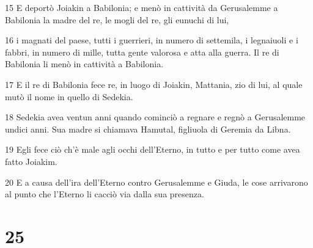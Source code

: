 \par 15 E deportò Joiakin a Babilonia; e menò in cattività da Gerusalemme a Babilonia la madre del re, le mogli del re, gli eunuchi di lui,
\par 16 i magnati del paese, tutti i guerrieri, in numero di settemila, i legnaiuoli e i fabbri, in numero di mille, tutta gente valorosa e atta alla guerra. Il re di Babilonia li menò in cattività a Babilonia.
\par 17 E il re di Babilonia fece re, in luogo di Joiakin, Mattania, zio di lui, al quale mutò il nome in quello di Sedekia.
\par 18 Sedekia avea ventun anni quando cominciò a regnare e regnò a Gerusalemme undici anni. Sua madre si chiamava Hamutal, figliuola di Geremia da Libna.
\par 19 Egli fece ciò ch'è male agli occhi dell'Eterno, in tutto e per tutto come avea fatto Joiakim.
\par 20 E a causa dell'ira dell'Eterno contro Gerusalemme e Giuda, le cose arrivarono al punto che l'Eterno li cacciò via dalla sua presenza.

\chapter{25}

